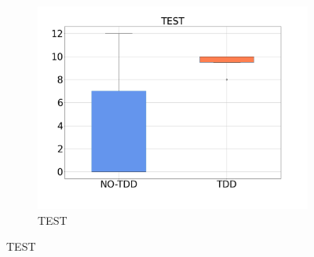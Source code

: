 \begin{figure}[H]
\begin{subfigure}{0.33\textwidth}
        \includegraphics[width=\linewidth]{figures/box_plots/task1/TEST.png}
        \caption{TEST}
        \label{bp_task1_test}
    \end{subfigure}


\end{figure}
